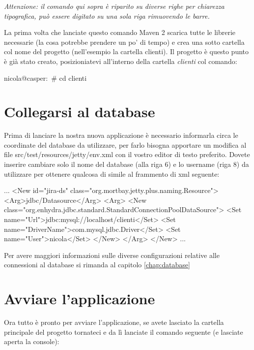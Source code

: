 \emph{Attenzione: il comando qui sopra è riparito su diverse righe per chiarezza tipografica, può  essere digitato su una sola riga rimuovendo le barre.}

La prima volta che lanciate questo comando Maven 2 scarica tutte le librerie necessarie (la cosa potrebbe prendere un po' di tempo) e crea una sotto cartella col nome del progetto (nell'esempio la cartella clienti). Il progetto è questo punto è già stato creato, posizioniatevi all'interno della cartella  \emph{clienti} col comando:

\begin{bash}
nicola@casper:~# cd clienti
\end{bash}


\section{Collegarsi al database}\label{sec:db-link}

Prima di lanciare la nostra nuova applicazione è necessario informarla circa le coordinate del database da utilizzare, per farlo bisogna apportare un modifica al file src/test/resources/jetty/env.xml con il vostro editor di testo preferito. Dovete inserire cambiare solo il nome del database (alla riga 6) e lo username (riga 8) da utilizzare per ottenere qualcosa di simile al frammento di xml seguente:

\begin{xml}
...
<New id="jira-ds" class="org.mortbay.jetty.plus.naming.Resource">
  <Arg>jdbc/Datasource</Arg>
  <Arg>
    <New class="org.enhydra.jdbc.standard.StandardConnectionPoolDataSource">
      <Set name="Url">jdbc:mysql://localhost/clienti</Set>
      <Set name="DriverName">com.mysql.jdbc.Driver</Set>
      <Set name="User">nicola</Set>
    </New>
  </Arg>
</New>
...
\end{xml}

\begin{nota}
Per avere maggiori informazioni sulle diverse configurazioni relative alle connessioni al database si rimanda al capitolo \ref{chap:database}
\end{nota}


\section{Avviare l'applicazione}
Ora tutto è pronto per avviare l'applicazione, se avete lasciato la cartella principale del progetto tornateci e da lì lanciate il comando seguente (e lasciate aperta la console):


